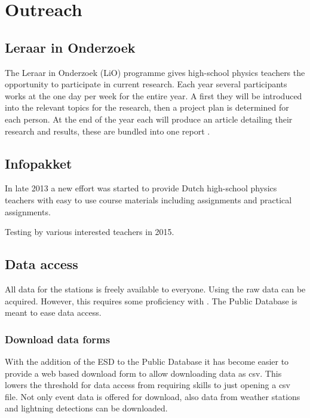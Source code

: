 \chapter{Outreach}
\label{ch:outreach}

\section{Leraar in Onderzoek}

The Leraar in Onderzoek (LiO) programme gives high-school physics
teachers the opportunity to participate in current research. Each year
several participants works at the \nikhef one day per week for the
entire year. A first they will be introduced into the relevant topics
for the research, then a project plan is determined for each person. At
the end of the year each will produce an article detailing their
research and results, these are bundled into one report
\cite{lio2009, lio2010, lio2011, lio2012}.


\section{Infopakket}

In late 2013 a new effort was started to provide Dutch high-school
physics teachers with easy to use course materials including assignments
and practical assignments.

Testing by various interested teachers in 2015.


\section{Data access}

All data for the \hisparc stations is freely available to everyone.
Using \sapphire the raw data can be acquired. However, this requires
some proficiency with \python. The Public Database is meant to ease data
access.


\subsection{Download data forms}

With the addition of the ESD to the Public Database it has become easier
to provide a web based download form to allow downloading data as csv.
This lowers the threshold for data access from requiring \python skills
to just opening a csv file. Not only \hisparc event data is offered for
download, also data from \hisparc weather stations and \knmi lightning
detections can be downloaded.


